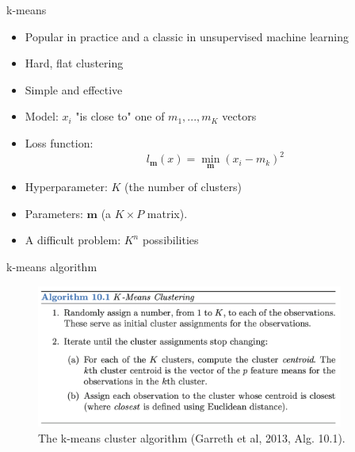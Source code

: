 \documentclass[10pt]{beamer}
\begin{document}
\begin{frame}{k-means}
\begin{itemize}
\item Popular in practice and a classic in unsupervised machine learning\pause
\item Hard, flat clustering
\item Simple and effective\pause
\item {\color{uured} Model}: $x_i$ "is close to" one of $m_1,...,m_K$ vectors
\item {\color{uured} Loss function}:
\[
l_\mathbf{m} (x) = \min_\mathbf{m} (x_i - m_k)^2
\]
\pause
\item {\color{uured} Hyperparameter}: $K$ (the number of clusters)
\item {\color{uured} Parameters}:  $\mathbf{m}$ (a $K \times P$ matrix).
\pause
\item A {\color{uured} difficult} problem: $K^n$ possibilities
\end{itemize}

\end{frame}


\begin{frame}{k-means algorithm}

\begin{figure}[h]
\centering
\includegraphics[width=0.9\textwidth]{fig/algo_10_1_kmeans.png}
\caption{The k-means cluster algorithm (Garreth et al, 2013, Alg. 10.1).}
\end{figure}


\end{frame}
\end{document}
